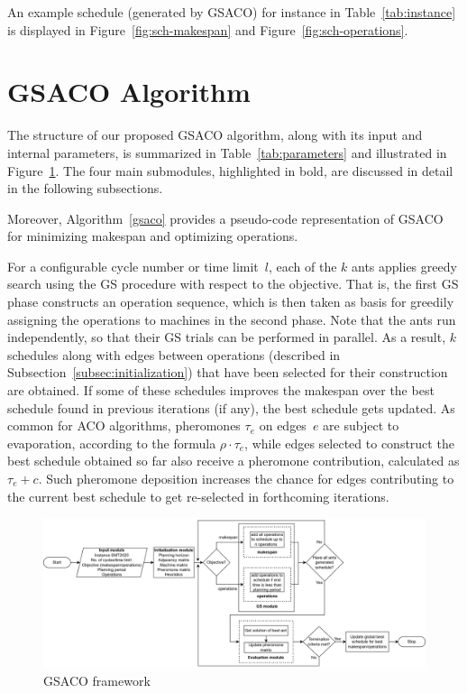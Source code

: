 \documentclass[runningheads]{llncs}
\begin{document}
An example schedule (generated by GSACO) for instance in Table~\ref{tab:instance} 
is displayed in Figure~\ref{fig:sch-makespan} and Figure~\ref{fig:sch-operations}.


\section{GSACO Algorithm}
\label{sec:gsaco}

The structure of our proposed GSACO algorithm, along with its input and internal parameters, 
is summarized in Table~\ref{tab:parameters} and 
illustrated in Figure~\ref{fig:aco-flowchart}. 
The four main submodules, highlighted in bold, are discussed in detail in the following subsections.

Moreover, Algorithm~\ref{gsaco} provides a pseudo-code representation of
GSACO for minimizing makespan and optimizing operations.

For a configurable cycle number or time limit~$l$,
each of the $k$ ants applies greedy search
using the GS procedure with respect to the objective.
That is, the first GS phase constructs an operation sequence, which is
then taken as basis for greedily assigning the operations to machines
in the second phase.   
Note that the ants run independently, so that their GS trials
can be performed in parallel.
As a result, $k$ schedules along with edges between operations
(described in Subsection~\ref{subsec:initialization})
that have been selected for their construction are obtained.
If some of these schedules improves the makespan over the best
schedule found in previous iterations (if any),
the best schedule gets updated.
As common for ACO algorithms,
pheromones $\tau_e$ on edges~$e$ are subject to evaporation,
according to the formula $\rho\cdot\tau_e$,
while edges selected to construct the best schedule obtained
so far also receive a pheromone contribution,
calculated as $\tau_e+c$.
Such pheromone deposition increases the chance for edges contributing to the
current best schedule
to get re-selected %
in forthcoming iterations.

\begin{figure}[t]
	\includegraphics[width=\textwidth]{aco-flowchart.png}
	\caption{GSACO framework}
	\label{fig:aco-flowchart}
\end{figure}
\end{document}

